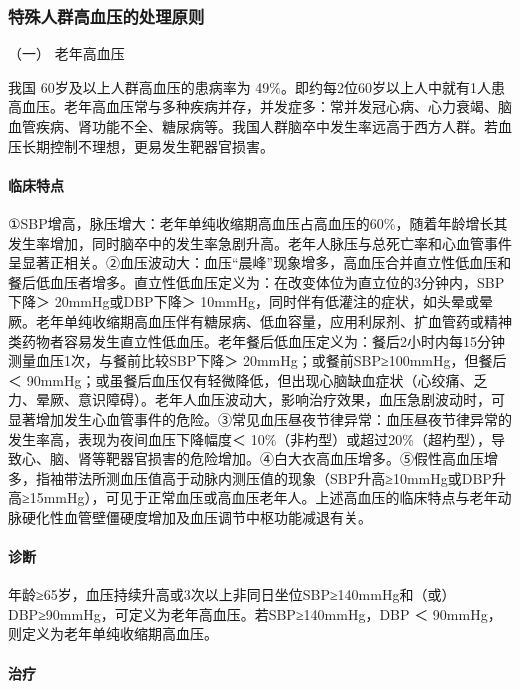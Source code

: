 \subsubsection{特殊人群高血压的处理原则}

\hypertarget{text00409.htmlux5cux23CHP17-3-1-8-1}{}
（一） 老年高血压

我国 60岁及以上人群高血压的患病率为
49\%。即约每2位60岁以上人中就有1人患高血压。老年高血压常与多种疾病并存，并发症多：常并发冠心病、心力衰竭、脑血管疾病、肾功能不全、糖尿病等。我国人群脑卒中发生率远高于西方人群。若血压长期控制不理想，更易发生靶器官损害。

\paragraph{临床特点}

①SBP增高，脉压增大：老年单纯收缩期高血压占高血压的60\%，随着年龄增长其发生率增加，同时脑卒中的发生率急剧升高。老年人脉压与总死亡率和心血管事件呈显著正相关。②血压波动大：血压“晨峰”现象增多，高血压合并直立性低血压和餐后低血压者增多。直立性低血压定义为：在改变体位为直立位的3分钟内，SBP下降＞
20mmHg或DBP下降＞
10mmHg，同时伴有低灌注的症状，如头晕或晕厥。老年单纯收缩期高血压伴有糖尿病、低血容量，应用利尿剂、扩血管药或精神类药物者容易发生直立性低血压。老年餐后低血压定义为：餐后2小时内每15分钟测量血压1次，与餐前比较SBP下降＞
20mmHg；或餐前SBP≥100mmHg，但餐后＜
90mmHg；或虽餐后血压仅有轻微降低，但出现心脑缺血症状（心绞痛、乏力、晕厥、意识障碍）。老年人血压波动大，影响治疗效果，血压急剧波动时，可显著增加发生心血管事件的危险。③常见血压昼夜节律异常：血压昼夜节律异常的发生率高，表现为夜间血压下降幅度＜
10\%（非杓型）或超过20\%（超杓型），导致心、脑、肾等靶器官损害的危险增加。④白大衣高血压增多。⑤假性高血压增多，指袖带法所测血压值高于动脉内测压值的现象（SBP升高≥10mmHg或DBP升高≥15mmHg），可见于正常血压或高血压老年人。上述高血压的临床特点与老年动脉硬化性血管壁僵硬度增加及血压调节中枢功能减退有关。

\paragraph{诊断}

年龄≥65岁，血压持续升高或3次以上非同日坐位SBP≥140mmHg和（或）DBP≥90mmHg，可定义为老年高血压。若SBP≥140mmHg，DBP
＜ 90mmHg，则定义为老年单纯收缩期高血压。

\paragraph{治疗}

